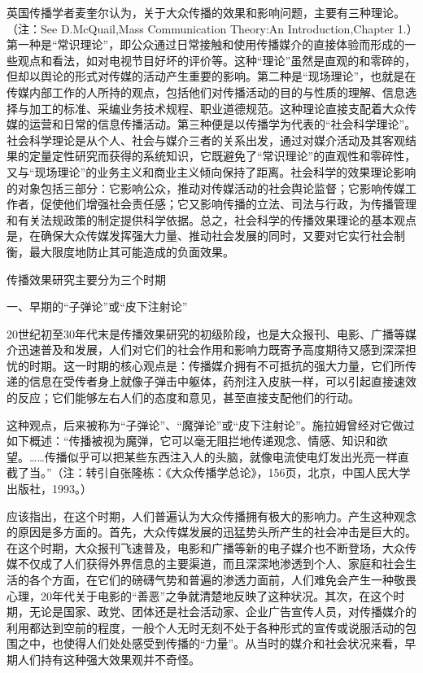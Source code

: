 \documentclass[UTF8,12pt]{ctexart}
\numberwithin{equation}{section} %
\numberwithin{figure}{section}
\numberwithin{table}{section}
\begin{document}
	英国传播学者麦奎尔认为，关于大众传播的效果和影响问题，主要有三种理论。（注：See D.McQuail,Mass Communication Theory:An Introduction,Chapter 1.）第一种是“常识理论”，即公众通过日常接触和使用传播媒介的直接体验而形成的一些观点和看法，如对电视节目好坏的评价等。这种“理论”虽然是直观的和零碎的，但却以舆论的形式对传媒的活动产生重要的影响。第二种是“现场理论”，也就是在传媒内部工作的人所持的观点，包括他们对传播活动的目的与性质的理解、信息选择与加工的标准、采编业务技术规程、职业道德规范。这种理论直接支配着大众传媒的运营和日常的信息传播活动。第三种便是以传播学为代表的“社会科学理论”。社会科学理论是从个人、社会与媒介三者的关系出发，通过对媒介活动及其客观结果的定量定性研究而获得的系统知识，它既避免了“常识理论”的直观性和零碎性，又与“现场理论”的业务主义和商业主义倾向保持了距离。社会科学的效果理论影响的对象包括三部分：它影响公众，推动对传媒活动的社会舆论监督；它影响传媒工作者，促使他们增强社会责任感；它又影响传播的立法、司法与行政，为传播管理和有关法规政策的制定提供科学依据。总之，社会科学的传播效果理论的基本观点是，在确保大众传媒发挥强大力量、推动社会发展的同时，又要对它实行社会制衡，最大限度地防止其可能造成的负面效果。
	
	
	传播效果研究主要分为三个时期
	
	一、早期的“子弹论”或“皮下注射论”
	
	20世纪初至30年代末是传播效果研究的初级阶段，也是大众报刊、电影、广播等媒介迅速普及和发展，人们对它们的社会作用和影响力既寄予高度期待又感到深深担忧的时期。这一时期的核心观点是：传播媒介拥有不可抵抗的强大力量，它们所传递的信息在受传者身上就像子弹击中躯体，药剂注入皮肤一样，可以引起直接速效的反应；它们能够左右人们的态度和意见，甚至直接支配他们的行动。
	
	这种观点，后来被称为“子弹论”、“魔弹论”或“皮下注射论”。施拉姆曾经对它做过如下概述：“传播被视为魔弹，它可以毫无阻拦地传递观念、情感、知识和欲望。……传播似乎可以把某些东西注入人的头脑，就像电流使电灯发出光亮一样直截了当。”（注：转引自张隆栋：《大众传播学总论》，156页，北京，中国人民大学出版社，1993。）
	
	应该指出，在这个时期，人们普遍认为大众传播拥有极大的影响力。产生这种观念的原因是多方面的。首先，大众传媒发展的迅猛势头所产生的社会冲击是巨大的。在这个时期，大众报刊飞速普及，电影和广播等新的电子媒介也不断登场，大众传媒不仅成了人们获得外界信息的主要渠道，而且深深地渗透到个人、家庭和社会生活的各个方面，在它们的磅礴气势和普遍的渗透力面前，人们难免会产生一种敬畏心理，20年代关于电影的“善恶”之争就清楚地反映了这种状况。其次，在这个时期，无论是国家、政党、团体还是社会活动家、企业广告宣传人员，对传播媒介的利用都达到空前的程度，一般个人无时无刻不处于各种形式的宣传或说服活动的包围之中，也使得人们处处感受到传播的“力量”。从当时的媒介和社会状况来看，早期人们持有这种强大效果观并不奇怪。
	
\end{document}
